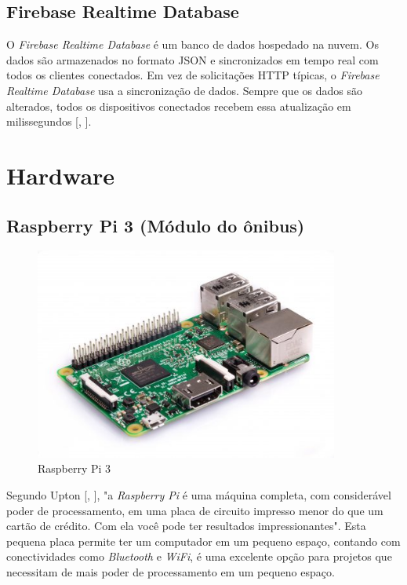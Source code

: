 \documentclass[
	12pt,				%
	oneside,			%
	a4paper,			%
	brazil				%
]{abntex2}
\newcommand{\citecustom}[1]{[\citeauthoronline{#1}, \citeyear{#1}]}
\begin{document}
\subsection{Firebase Realtime Database}

O \textit{Firebase Realtime Database} é um banco de dados hospedado na nuvem. Os dados são armazenados no formato JSON e sincronizados em tempo real com todos os clientes conectados.
Em vez de solicitações HTTP típicas, o \textit{Firebase Realtime Database} usa a sincronização de dados. Sempre que os dados são alterados, todos os dispositivos conectados recebem essa atualização em milissegundos \citecustom{Firebase}.


\section{Hardware}

\subsection{Raspberry Pi 3 (Módulo do ônibus)}

\begin{figure}[H]
\centering
\includegraphics[width=10cm, center]{images/raspberry-pi}
\caption{Raspberry Pi 3}
\label{Rotulo}
\end{figure}

Segundo Upton \citecustom{Upton2017}, "a \textit{Raspberry Pi} é uma máquina completa, com considerável poder de processamento, em uma placa de circuito impresso menor do que um cartão de crédito. Com ela você pode ter resultados impressionantes". Esta pequena placa permite ter um computador em um pequeno espaço, contando com conectividades como \textit{Bluetooth} e \textit{WiFi}, é uma excelente opção para projetos que necessitam de mais poder de processamento em um pequeno espaço. 
\end{document}
